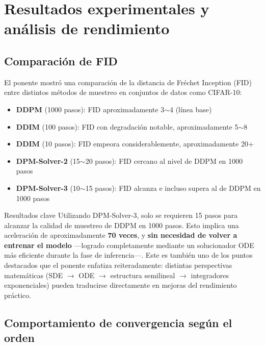 \section{Resultados experimentales y análisis de rendimiento}

\subsection{Comparación de FID}

El ponente mostró una comparación de la distancia de Fréchet Inception (FID) entre distintos métodos de muestreo en conjuntos de datos como CIFAR-10:

\begin{itemize}
    \item \textbf{DDPM} (1000 pasos): FID aproximadamente 3$\sim$4 (línea base)
    \item \textbf{DDIM} (100 pasos): FID con degradación notable, aproximadamente 5$\sim$8
    \item \textbf{DDIM} (10 pasos): FID empeora considerablemente, aproximadamente 20+
    \item \textbf{DPM-Solver-2} (15$\sim$20 pasos): FID cercano al nivel de DDPM en 1000 pasos
    \item \textbf{DPM-Solver-3} (10$\sim$15 pasos): FID alcanza e incluso supera al de DDPM en 1000 pasos
\end{itemize}

\begin{importantbox}{Resultados clave}
Utilizando DPM-Solver-3, solo se requieren 15 pasos para alcanzar la calidad de muestreo de DDPM en 1000 pasos. Esto implica una aceleración de aproximadamente \textbf{70 veces}, y \textbf{sin necesidad de volver a entrenar el modelo} —logrado completamente mediante un solucionador ODE más eficiente durante la fase de inferencia—. Este es también uno de los puntos destacados que el ponente enfatiza reiteradamente: distintas perspectivas matemáticas (SDE $\to$ ODE $\to$ estructura semilineal $\to$ integradores exponenciales) pueden traducirse directamente en mejoras del rendimiento práctico.
\end{importantbox}

\subsection{Comportamiento de convergencia según el orden}

